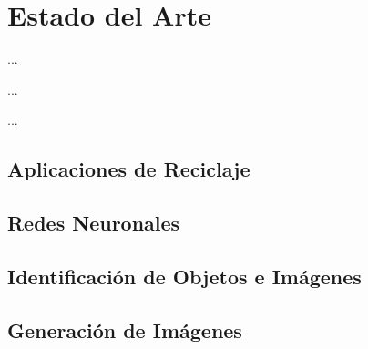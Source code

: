 %
%

\chapter{Estado del Arte}

\begin{FraseCelebre}
\begin{Frase}
...
\end{Frase}
\begin{Fuente}
...
\end{Fuente}
\end{FraseCelebre}

\begin{resumen}
...
\end{resumen}


\section{Aplicaciones de Reciclaje}
\label{cap2:sec:aplicaciones-reciclaje}


\section{Redes Neuronales}
\label{cap2:sec:redes-neuronales}


\section{Identificación de Objetos e Imágenes}
\label{cap2:sec:identificacion}


\section{Generación de Imágenes}
\label{cap2:sec:generacion}


